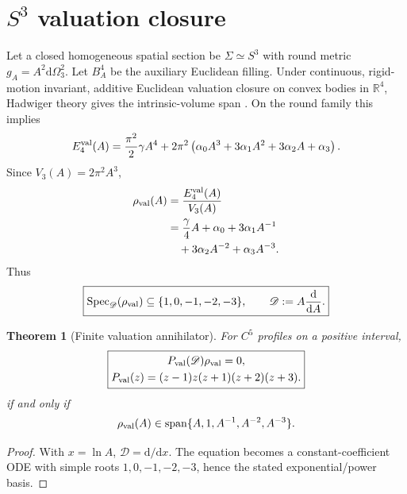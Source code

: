 \documentclass[aps,prd,reprint,nofootinbib,superscriptaddress,floatfix]{revtex4-2}
\numberwithin{equation}{section}
\theoremstyle{definition}
\theoremstyle{plain}
\newtheorem{theorem}{Theorem}[section]
\newcommand{\R}{\mathbb R}
\newcommand{\dd}{\mathrm d}
\newcommand{\Sthree}{S^3}
\newcommand{\Bfour}{B^4}
\newcommand{\Dil}{\mathscr D}
\newcommand{\Spec}{\operatorname{Spec}}
\newcommand{\spanop}{\operatorname{span}}
\begin{document}
\section{\texorpdfstring{\(S^3\)}{S3} valuation closure}

Let a closed homogeneous spatial section be \(\Sigma\simeq\Sthree\) with round metric \(g_A=A^2\dd\Omega_3^2\).  Let \(\Bfour_A\) be the auxiliary Euclidean filling.  Under continuous, rigid-motion invariant, additive Euclidean valuation closure on convex bodies in \(\R^4\), Hadwiger theory gives the intrinsic-volume span \cite{Hadwiger1957,Schneider2014}.  On the round family this implies
\begin{equation}
E_4^{\rm val}(A)
=
\frac{\pi^2}{2}\gamma A^4
+
2\pi^2
\left(
\alpha_0A^3+3\alpha_1A^2+3\alpha_2A+\alpha_3
\right).
\end{equation}
Since \(V_3(A)=2\pi^2A^3\),
\begin{equation}
\begin{split}
\rho_{\rm val}(A)
&=\frac{E_4^{\rm val}(A)}{V_3(A)}\\
&=\frac{\gamma}{4}A+\alpha_0+3\alpha_1A^{-1}\\
&\quad+3\alpha_2A^{-2}+\alpha_3A^{-3}.
\end{split}
\end{equation}
Thus
\begin{equation}
\boxed{
\Spec_\Dil(\rho_{\rm val})\subseteq \{1,0,-1,-2,-3\},
\qquad
\Dil:=A\frac{\dd}{\dd A}.
}
\end{equation}

\begin{theorem}[Finite valuation annihilator]\label{thm:val-ann}
For \(C^5\) profiles on a positive interval,
\begin{equation}
\boxed{\begin{gathered}
P_{\rm val}(\Dil)\rho_{\rm val}=0,\\
P_{\rm val}(z)=(z-1)z(z+1)(z+2)(z+3).
\end{gathered}}
\end{equation}
if and only if
\begin{equation}
\rho_{\rm val}(A)\in
\spanop\{A,1,A^{-1},A^{-2},A^{-3}\}.
\end{equation}
\end{theorem}

\begin{proof}
With \(x=\ln A\), \(\Dil=\dd/\dd x\).  The equation becomes a constant-coefficient ODE with simple roots \(1,0,-1,-2,-3\), hence the stated exponential/power basis.
\end{proof}
\end{document}
